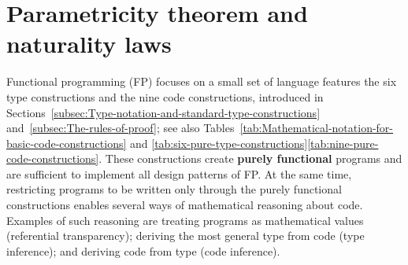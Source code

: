 \begin{comment}
the rules of derivation of the logic the compiler can check out all
these logical rules but the compiler does not know that your logic
is inconsistent maybe and then it will deep have derived an inconsistent
result falsehood from truth for example and that will crash at runtime
now we know that crashing at runtime is not a good outcome so in fact
languages like Oh camel have been studied and for other languages
some subsets of Haskell I believe called safe Haskell have been studied
and it has been shown that they cannot crash and they're the way to
show it mathematically is to use the fact that they are based on a
complete and consistent logic and then all you need to show is that
your compiler does not have some critical bugs that allow it to oversee
that you have not followed the derivation rules of the logic that
is an extremely valuable feature of functional programming languages
that are based on the Curie habit correspondence you can prove their
safety at compile time or at least exclude a large number of possible
bugs and errors certainly these languages are quite large and they
include features that are not covered by the Carey Hart correspondence
type constructors that I have not considered in this tutorial and
those might may not be safe but at least the foundation of these languages
the foundation of the type system will be safe so that is the final
lesson from the great Howard correspondence this concludes the tutorial 
\end{comment}


\chapter{Parametricity theorem and naturality laws\label{app:Proofs-of-naturality-parametricity}}

Functional programming (FP) focuses on a small set of language features
\textemdash{} the six type constructions and the nine code constructions,
introduced in Sections~\ref{subsec:Type-notation-and-standard-type-constructions}
and~\ref{subsec:The-rules-of-proof}; see also Tables~\ref{tab:Mathematical-notation-for-basic-code-constructions}
and \ref{tab:six-pure-type-constructions}\textendash \ref{tab:nine-pure-code-constructions}.
These constructions create \textbf{purely functional} programs
and are sufficient to implement all design patterns of FP. At the
same time, restricting programs to be written only through the purely
functional constructions enables several ways of mathematical reasoning
about code. Examples of such reasoning are treating programs as mathematical
values (referential transparency); deriving the most general type
from code (type inference); and deriving code from type (code inference).

